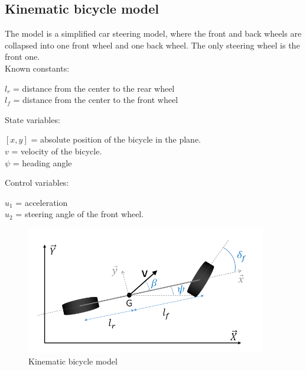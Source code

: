 \documentclass[12pt]{article}
\begin{document}
\subsection{Kinematic bicycle model \cite{kbm}}
The model is a simplified car steering model, where the front and back wheels are collapsed into one front wheel and one back wheel. The only steering wheel is the front one. \\
\smallskip
Known constants:
\begin{center}
\( l_r \) = distance from the center to the rear wheel \\
\( l_f \) = distance from the center to the front wheel \\
\end{center}
State variables:
\begin{center}
\( [x, y] \) = absolute position of the bicycle in the plane. \\
\( v \) = velocity of the bicycle. \\
\( \psi \) = heading angle \\
\end{center}
Control variables:
\begin{center}
\( u_1 \) = acceleration \\
\( u_2 \) = steering angle of the front wheel. \\
\end{center}
\begin{figure}[!h]
\includegraphics[width=\textwidth]{bike}
\caption{Kinematic bicycle model}
\end{figure}
\smallskip

\clearpage
\end{document}
